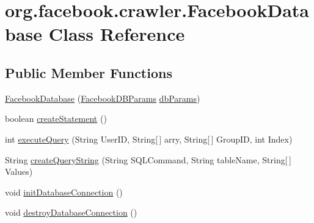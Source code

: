\hypertarget{classorg_1_1facebook_1_1crawler_1_1_facebook_database}{\section{org.\-facebook.\-crawler.\-Facebook\-Database Class Reference}
\label{classorg_1_1facebook_1_1crawler_1_1_facebook_database}
}
\subsection*{Public Member Functions}
\begin{DoxyCompactItemize}
\item 
\hyperlink{classorg_1_1facebook_1_1crawler_1_1_facebook_database_a5ae64c7e16e90aca4156738255bc676f}{Facebook\-Database} (\hyperlink{classorg_1_1facebook_1_1crawler_1_1_facebook_d_b_params}{Facebook\-D\-B\-Params} \hyperlink{classorg_1_1facebook_1_1crawler_1_1_facebook_database_a34e83032342cbc6e64111e127b123701}{db\-Params})
\item 
boolean \hyperlink{classorg_1_1facebook_1_1crawler_1_1_facebook_database_ae9cc0367023a4ac918a3e875765f2cc4}{create\-Statement} ()
\item 
int \hyperlink{classorg_1_1facebook_1_1crawler_1_1_facebook_database_ad897bd9bf770f72c5492a31100506217}{execute\-Query} (String User\-I\-D, String\mbox{[}$\,$\mbox{]} arry, String\mbox{[}$\,$\mbox{]} Group\-I\-D, int Index)
\item 
String \hyperlink{classorg_1_1facebook_1_1crawler_1_1_facebook_database_ae79fc854e8901cdcede8cceba7e30704}{create\-Query\-String} (String S\-Q\-L\-Command, String table\-Name, String\mbox{[}$\,$\mbox{]} Values)
\item 
void \hyperlink{classorg_1_1facebook_1_1crawler_1_1_facebook_database_a4c22cf937429b08d5cdf5d1026660517}{init\-Database\-Connection} ()
\item 
void \hyperlink{classorg_1_1facebook_1_1crawler_1_1_facebook_database_a51c7bd4f29613d9ab64128d94c3132eb}{destroy\-Database\-Connection} ()
\end{DoxyCompactItemize}
